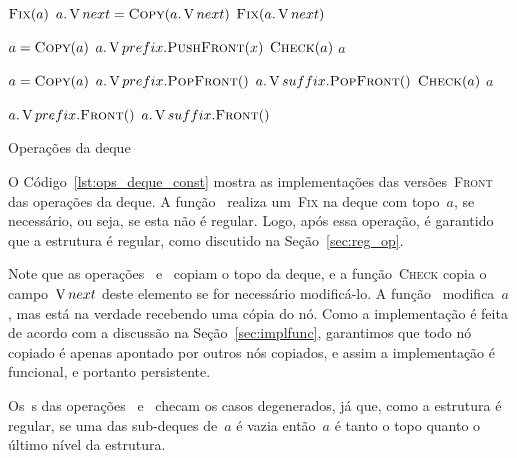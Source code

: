 \documentclass[main.tex]{subfiles}
\begin{document}
\begin{algorithm}
\begin{algorithmic}[1]

        \State $\Call{Fix}{a}$
        \State $a.\V{next} = \Call{Copy}{a.\V{next}}$
        \State $\Call{Fix}{a.\V{next}}$
    \EndIf
\EndFunction

    \State $a = \Call{Copy}{a}$
    \State $a.\V{prefix}.\Call{PushFront}{x}$
    \State $\Call{Check}{a}$
    \State \Return $a$
\EndFunction

    \State $a = \Call{Copy}{a}$
        \State $a.\V{prefix}.\Call{PopFront}{\null}$
    \Else
        \State $a.\V{suffix}.\Call{PopFront}{\null}$
    \EndIf
    \State $\Call{Check}{a}$
    \State \Return $a$
\EndFunction

        \State \Return $a.\V{prefix}.\Call{Front}{\null}$
    \Else
        \State \Return $a.\V{suffix}.\Call{Front}{\null}$
    \EndIf
\EndFunction

\end{algorithmic}
\caption{Operações da deque} \label{lst:ops_deque_const}
\end{algorithm}

O Código~\ref{lst:ops_deque_const} mostra as implementações das versões~\textsc{Front} das operações da deque. A função~ realiza um~\textsc{Fix} na deque com topo~$a$, se necessário, ou seja, se esta não é regular. Logo, após essa operação, é garantido que a estrutura é regular, como discutido na Seção~\ref{sec:reg_op}.

Note que as operações~ e~ copiam o topo da deque, e a função~\textsc{Check} copia o campo~$\operatorname{V}{next}$ deste elemento se for necessário modificá-lo. A função~ modifica~$a$, mas está na verdade recebendo uma cópia do nó. Como a implementação é feita de acordo com a discussão na Seção~\ref{sec:implfunc}, garantimos que todo nó copiado é apenas apontado por outros nós copiados, e assim a implementação é funcional, e portanto persistente.

Os~s das operações~ e~ checam os casos degenerados, já que, como a estrutura é regular, se uma das sub-deques de~$a$ é vazia então~$a$ é tanto o topo quanto o último nível da estrutura.
\end{document}

